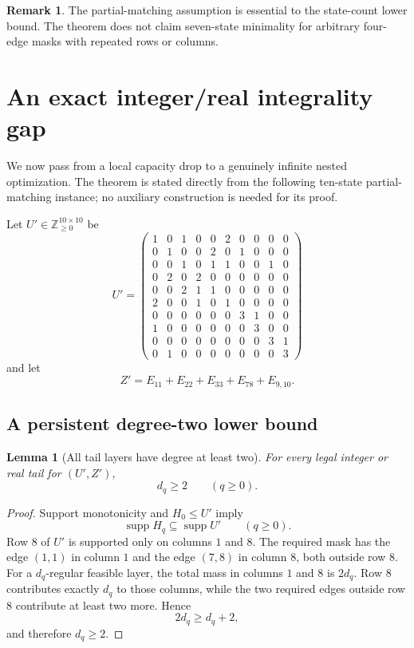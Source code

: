 \documentclass[11pt]{article}
\newtheorem{lemma}[theorem]{Lemma}
\theoremstyle{definition}
\newtheorem{remark}[theorem]{Remark}
\newcommand{\supp}{\operatorname{supp}}
\newcommand{\Z}{\mathbb Z}
\begin{document}
\begin{remark}
The partial-matching assumption is essential to the state-count lower bound.
The theorem does not claim seven-state minimality for arbitrary four-edge masks with repeated
rows or columns.
\end{remark}

\section{An exact integer/real integrality gap}
\label{sec:gap}

We now pass from a local capacity drop to a genuinely infinite nested optimization.
The theorem is stated directly from the following ten-state partial-matching instance; no
auxiliary construction is needed for its proof.

Let $U'\in\Z_{\ge0}^{10\times10}$ be
{\small
\[
U'=
\begin{pmatrix}
1&0&1&0&0&2&0&0&0&0\\
0&1&0&0&2&0&1&0&0&0\\
0&0&1&0&1&1&0&0&1&0\\
0&2&0&2&0&0&0&0&0&0\\
0&0&2&1&1&0&0&0&0&0\\
2&0&0&1&0&1&0&0&0&0\\
0&0&0&0&0&0&3&1&0&0\\
1&0&0&0&0&0&0&3&0&0\\
0&0&0&0&0&0&0&0&3&1\\
0&1&0&0&0&0&0&0&0&3
\end{pmatrix}
\]
}
and let
\[
Z'=E_{11}+E_{22}+E_{33}+E_{78}+E_{9,10}.
\]

\subsection{A persistent degree-two lower bound}

\begin{lemma}[All tail layers have degree at least two]
\label{lem:tail2}
For every legal integer or real tail for $(U',Z')$,
\[
d_q\ge2
\qquad(q\ge0).
\]
\end{lemma}

\begin{proof}
Support monotonicity and $H_0\le U'$ imply
\[
\supp H_q\subseteq\supp U'
\qquad(q\ge0).
\]
Row $8$ of $U'$ is supported only on columns $1$ and $8$.
The required mask has the edge $(1,1)$ in column $1$ and the edge $(7,8)$ in column $8$, both
outside row $8$.
For a $d_q$-regular feasible layer, the total mass in columns $1$ and $8$ is $2d_q$.
Row $8$ contributes exactly $d_q$ to those columns, while the two required edges outside row $8$
contribute at least two more.  Hence
\[
2d_q\ge d_q+2,
\]
and therefore $d_q\ge2$.
\end{proof}
\end{document}
